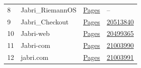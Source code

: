 \documentclass[a4paper,11pt]{article}
\begin{document}
\begin{otherlanguage}{english}
\begin{longtable}{>{\raggedright}p{1.2cm} >{\raggedright}p{3.5cm} >{\raggedright}p{3.5cm} >{\raggedright}p{3.5cm}}
8 & Jabri\_RiemannOS & \href{https://jabri-web.github.io/Jabri-RiemannOS/}{Pages} & -- \\
9 & Jabri\_Checkout & \href{https://jabri-web.github.io/Jabri_Checkout/}{Pages} & \href{https://doi.org/10.5281/zenodo.20513840}{20513840} \\
10 & Jabri-web & \href{https://jabri-web.github.io/Jabri-web/}{Pages} & \href{https://doi.org/10.5281/zenodo.20499365}{20499365} \\
11 & Jabri-com & \href{https://jabri-web.github.io/jabri-com/}{Pages} & \href{https://doi.org/10.5281/zenodo.21003990}{21003990} \\
12 & jabri.com & \href{https://jabri-web.github.io/jabri/}{Pages} & \href{https://doi.org/10.5281/zenodo.21003991}{21003991} \\

\end{longtable}

\end{otherlanguage}

\newpage
\end{document}
